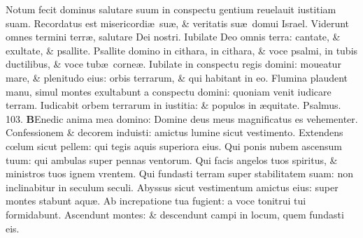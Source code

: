 \documentclass[a5paper,10pt]{book}
\def\ae{æ}
\def\oe{œ}
\begin{document}
\begin{multicols*}{2}
\newline \color{red} N\color{black}otum fecit dominus salutare suum in conspectu gentium reuelauit iustitiam suam.
\newline \color{red} R\color{black}ecordatus est misericordi\ae \ su\ae , \& veritatis su\ae \ domui Israel.
\newline \color{red} V\color{black}iderunt omnes termini terr\ae , salutare Dei nostri.
\newline \color{red} I\color{black}ubilate Deo omnis terra: cantate, \& exultate, \& psallite.
\newline \color{red} P\color{black}sallite domino in cithara, in cithara, \& voce psalmi, in tubis ductilibus, \& voce tub\ae \ corne\ae .
\newline \color{red} I\color{black}ubilate in conspectu regis domini: moueatur mare, \& plenitudo eius: orbis terrarum, \& qui habitant in eo.
\newline \color{red} F\color{black}lumina plaudent manu, simul montes exultabunt a conspectu domini: quoniam venit iudicare terram.
\newline \color{red} I\color{black}udicabit orbem terrarum in iustitia: \& populos in \ae quitate. \quad \color{red} Psalmus. \hypertarget{ps103}{103.} \color{black}
\vspace{-.5em}
\lettrine[lines=2]{\bfseries \color{red} B}{}Enedic anima mea domino: Domine deus meus magnificatus es vehementer.
\newline \color{red} C\color{black}onfessionem \& decorem induisti: amictus lumine sicut vestimento.
\newline \color{red} E\color{black}xtendens c\oe lum sicut pellem: qui tegis aquis superiora eius.
\newline \color{red} Q\color{black}ui ponis nubem ascensum tuum: qui ambulas super pennas ventorum.
\newline \color{red} Q\color{black}ui facis angelos tuos spiritus, \& ministros tuos ignem vrentem.
\newline \color{red} Q\color{black}ui fundasti terram super stabilitatem suam: non inclinabitur in seculum seculi.
\newline \color{red} A\color{black}byssus sicut vestimentum amictus eius: super montes stabunt aqu\ae .
\newline \color{red} A\color{black}b increpatione tua fugient: a voce tonitrui tui formidabunt.
\newline \color{red} A\color{black}scendunt montes: \& descendunt campi in locum, quem fundasti eis.

\end{multicols*}
\end{document}
